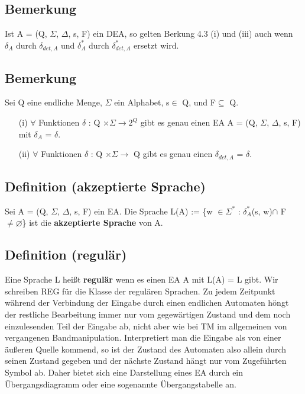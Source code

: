 \documentclass[a4paper,11pt]{article}
\begin{document}
\subsection{Bemerkung }
Ist A = (Q, $\Sigma$, $\Delta$, s, F) ein DEA, so gelten Berkung 4.3 (i) und (iii) auch wenn $\delta_{A}$ durch $\delta_{det, A}$ und $\delta_{A}^{*}$ durch $\delta_{det, A}^{*}$ ersetzt wird.

\subsection{Bemerkung}
Sei Q eine endliche Menge, $\Sigma$ ein Alphabet, s$\in$ Q, und F$\subseteq$ Q. 

\begin{itemize}
    \item [(i)] $\forall$ Funktionen $\delta$ : Q $\times \Sigma \rightarrow 2^{Q}$ gibt es genau einen EA A = (Q, $\Sigma$, $\Delta$, s, F) mit $\delta_{A}$ = $\delta$.
    \item [(ii)] $\forall$ Funktionen $\delta$ : Q $\times \Sigma \rightarrow$ Q gibt es genau einen $\delta_{det, A}$ = $\delta$. 
\end{itemize}

\subsection{Definition (akzeptierte Sprache)}
Sei A = (Q, $\Sigma$, $\Delta$, s, F) ein EA. Die Sprache L(A) := \{w $\in \Sigma^{*}$ : $\delta_{A}^{*}$(s, w)$\cap$ F $\neq \varnothing $\} ist die \textbf{akzeptierte Sprache} von A.

\subsection{Definition (regulär)} 
Eine Sprache L heißt \textbf{regulär} wenn es einen EA A mit L(A) = L gibt. Wir schreiben REG für die Klasse der regulären Sprachen. Zu jedem Zeitpunkt während der Verbindung der Eingabe durch einen endlichen Automaten höngt der restliche Bearbeitung immer nur vom gegewärtigen Zustand und dem noch einzulesenden Teil der Eingabe ab, nicht aber wie bei TM im allgemeinen von vergangenen Bandmanipulation. Interpretiert man die Eingabe als von einer äußeren Quelle kommend, so ist der  Zustand des Automaten also allein durch seinen Zustand gegeben und der nächste Zustand hängt nur vom Zugeführten Symbol ab. Daher bietet sich eine Darstellung eines EA durch ein Übergangsdiagramm oder eine sogenannte Übergangstabelle an.
\end{document}
